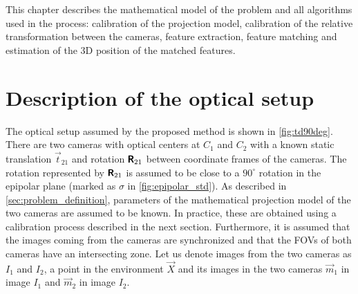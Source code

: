 This chapter describes the mathematical model of the problem and all algorithms used in the process: calibration of the projection model, calibration of the relative transformation between the cameras, feature extraction, feature matching and estimation of the 3D position of the matched features.

\section{Description of the optical setup}

The optical setup assumed by the proposed method is shown in \autoref{fig:td90deg}.
There are two cameras with optical centers at $C_1$ and $C_2$ with a known static translation $\vec{t}_{21}$ and rotation $\pmb{\mathsf{R}}_{21}$ between coordinate frames of the cameras.
The rotation represented by $\pmb{\mathsf{R}}_{21}$ is assumed to be close to a $90^\circ$ rotation in the epipolar plane (marked as $\sigma$ in \autoref{fig:epipolar_std}).
As described in \autoref{sec:problem_definition}, parameters of the mathematical projection model of the two cameras are assumed to be known. 
In practice, these are obtained using a calibration process described in the next section.
Furthermore, it is assumed that the images coming from the cameras are synchronized and that the FOVs of both cameras have an intersecting zone.
Let us denote images from the two cameras as $I_1$ and $I_2$, a point in the environment $\vec{X}$ and its images in the two cameras $\vec{m}_1$ in image $I_1$ and $\vec{m}_2$ in image $I_2$.

